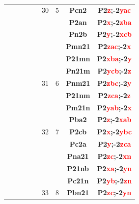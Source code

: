 \documentclass{article}      %
\begin{document}
\begin{small}
\begin{longtable}[c]{|c|c|c|c|c|c|c|c|c|}
	  &  & & & &\textrm{30}  &\textrm{5} &\textbf{Pcn2}         &\textbf{P2\textcolor{red}{z};-2\textcolor{red}{yac}}\\\cline{8-9}         
          &  & & & &  & &\textbf{P2an}         &\textbf{P2\textcolor{red}{x};-2\textcolor{red}{zba}}\\\cline{8-9}         
          &  & & & &  & &\textbf{Pn2b}         &\textbf{P2\textcolor{red}{y};-2\textcolor{red}{xcb}}\\\cline{6-9}         
          &  & & & &  & &\textbf{Pmn21}       &\textbf{P2\textcolor{red}{zac};-2\textcolor{red}{x}}\\\cline{8-9}         
          &  & & & &  & &\textbf{P21mn}       &\textbf{P2\textcolor{red}{xba};-2\textcolor{red}{y}}\\\cline{8-9}         
          &  & & & &  & &\textbf{Pn21m}       &\textbf{P2\textcolor{red}{ycb};-2\textcolor{red}{z}}\\\cline{8-9}         
	  &  & & & &\textrm{31}  &\textrm{6} &\textbf{Pnm21}       &\textbf{P2\textcolor{red}{zbc};-2\textcolor{red}{y}}\\\cline{8-9}         
          &  & & & &  & &\textbf{P21nm}       &\textbf{P2\textcolor{red}{zca};-2\textcolor{red}{z}}\\\cline{8-9}         
          &  & & & &  & &\textbf{Pm21n}       &\textbf{P2\textcolor{red}{yab};-2\textcolor{red}{x}}\\\cline{6-9}         
          &  & & & &  & &\textbf{Pba2}         &\textbf{P2\textcolor{red}{z};-2\textcolor{red}{xab}}\\\cline{8-9}         
	  &  & & & &\textrm{32}  &\textrm{7} &\textbf{P2cb}         &\textbf{P2\textcolor{red}{x};-2\textcolor{red}{ybc}}\\\cline{8-9}         
          &  & & & &  & &\textbf{Pc2a}         &\textbf{P2\textcolor{red}{y};-2\textcolor{red}{zca}}\\\cline{6-9}         
          &  & & & &  & &\textbf{Pna21}       &\textbf{P2\textcolor{red}{zc};-2\textcolor{red}{xn}}\\\cline{8-9}         
          &  & & & &  & &\textbf{P21nb}       &\textbf{P2\textcolor{red}{xa};-2\textcolor{red}{yn}}\\\cline{8-9}         
          &  & & & &  & &\textbf{Pc21n}       &\textbf{P2\textcolor{red}{yb};-2\textcolor{red}{zn}}\\\cline{8-9}         
	  &  & & & &\textrm{33}  &\textrm{8} &\textbf{Pbn21}       &\textbf{P2\textcolor{red}{zc};-2\textcolor{red}{yn}}\\\cline{8-9}         

\end{longtable}
\end{small}
\end{document}

